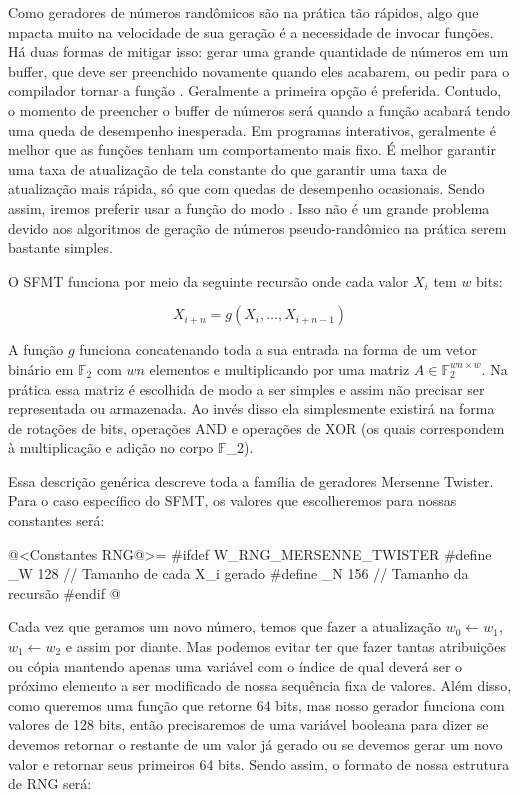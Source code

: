 Como geradores de números randômicos são na prática tão rápidos, algo
que mpacta muito na velocidade de sua geração é a necessidade de
invocar funções. Há duas formas de mitigar isso: gerar uma grande
quantidade de números em um buffer, que deve ser preenchido novamente
quando eles acabarem, ou pedir para o compilador tornar a
função . Geralmente a primeira opção é
preferida. Contudo, o momento de preencher o buffer de números será
quando a função acabará tendo uma queda de desempenho inesperada. Em
programas interativos, geralmente é melhor que as funções tenham um
comportamento mais fixo. É melhor garantir uma taxa de atualização de
tela constante do que garantir uma taxa de atualização mais rápida, só
que com quedas de desempenho ocasionais. Sendo assim, iremos preferir
usar a função do modo . Isso não é um grande
problema devido aos algoritmos de geração de números pseudo-randômico
na prática serem bastante simples.

O SFMT funciona por meio da seguinte recursão onde cada valor $X_i$ tem
$w$ bits:

$$
X_{i+n}=g(X_i, \ldots, X_{i+n-1})
$$

A função $g$ funciona concatenando toda a sua entrada na forma de um
vetor binário em $\mathbb{F}_2$ com $wn$ elementos e multiplicando por
uma matriz $A\in\mathbb{F}_2^{wn\times w}$. Na prática essa matriz é
escolhida de modo a ser simples e assim não precisar ser representada
ou armazenada. Ao invés disso ela simplesmente existirá na forma de
rotações de bits, operações AND e operações de XOR (os quais
correspondem à multiplicação e adição no corpo $\mathbb{F}$_2).

Essa descrição genérica descreve toda a família de geradores Mersenne
Twister. Para o caso específico do SFMT, os valores que escolheremos
para nossas constantes será:

\iniciocodigo
@<Constantes RNG@>=
#ifdef W_RNG_MERSENNE_TWISTER
#define _W 128 // Tamanho de cada X_i gerado
#define _N 156 // Tamanho da recursão
#endif
@
\fimcodigo

Cada vez que geramos um novo número, temos que fazer a atualização
$w_0 \leftarrow w_1$, $w_1 \leftarrow w_2$ e assim por diante. Mas
podemos evitar ter que fazer tantas atribuições ou cópia mantendo
apenas uma variável com o índice de qual deverá ser o próximo elemento
a ser modificado de nossa sequência fixa de 
valores. Além disso, como queremos uma função que retorne 64 bits, mas
nosso gerador funciona com valores de 128 bits, então precisaremos de
uma variável booleana para dizer se devemos retornar o restante de um
valor já gerado ou se devemos gerar um novo valor e retornar seus
primeiros 64 bits. Sendo assim, o formato de nossa estrutura de RNG
será:

